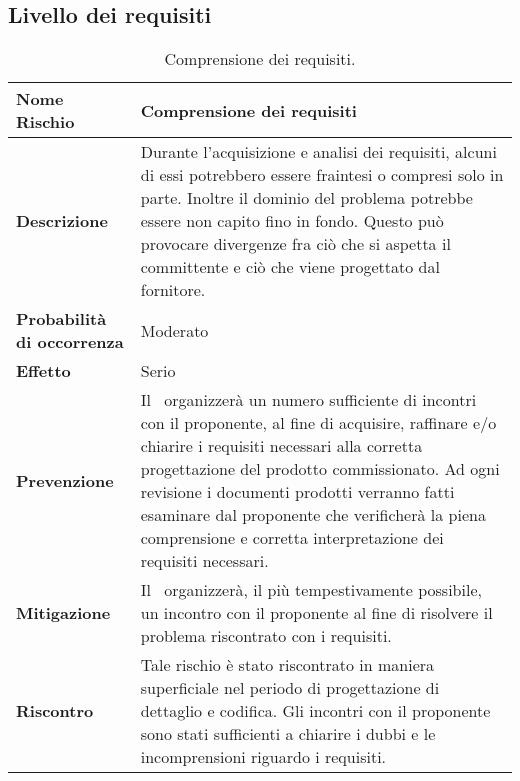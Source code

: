\documentclass[../PianoDiProgetto.tex]{subfiles}
\begin{document}
		\subsection{Livello dei requisiti}
				\begin{table}[H]
				\center
				\begin{tabularx}{\textwidth}{X X}
					\noalign{\hrule height 1.5pt}
					\textbf{Nome Rischio} & Comprensione dei requisiti \\
					\hline
					\textbf{Descrizione}  & Durante l'acquisizione e analisi dei requisiti, alcuni di essi potrebbero essere fraintesi o compresi solo in parte. Inoltre il dominio del problema
potrebbe essere non capito fino in fondo. Questo può provocare divergenze fra ciò che si aspetta il committente e ciò che viene progettato dal fornitore. \\
					\hline
					\textbf{Probabilità di occorrenza}  & Moderato \\
					\hline
					\textbf{Effetto}  & Serio \\
					\hline
					\textbf{Prevenzione}  & Il \responsabilediprogetto\ organizzerà un numero sufficiente di incontri con il proponente, al fine di acquisire, raffinare e/o chiarire i requisiti necessari alla corretta progettazione del prodotto commissionato. Ad ogni revisione i documenti prodotti verranno fatti esaminare dal proponente che verificherà la piena comprensione e corretta interpretazione dei requisiti necessari. \\
					\hline
					\textbf{Mitigazione}  & Il \responsabilediprogetto\  organizzerà, il più tempestivamente possibile, un incontro con il proponente al fine di risolvere il problema riscontrato con i requisiti. \\
					\noalign{\hrule height 1.5pt}
					\hline
					\textbf{Riscontro} & Tale rischio è stato riscontrato in maniera superficiale nel periodo di progettazione di dettaglio e codifica. Gli incontri con il proponente sono stati sufficienti a chiarire i dubbi e le incomprensioni riguardo i requisiti.  \\
			\end{tabularx}
			\caption{Comprensione dei requisiti. \label{tab:table_label}}
		\end{table}
\end{document}
